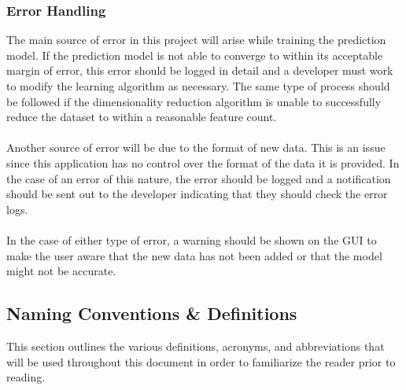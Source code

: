 \documentclass[titlepage]{article}
\begin{document}
\subsubsection{Error Handling}
The main source of error in this project will arise while training the prediction model. If the prediction model is not able to converge to within its acceptable margin of error, this error should be logged in detail and a developer must work to modify the learning algorithm as necessary. The same type of process should be followed if the dimensionality reduction algorithm is unable to successfully reduce the dataset to within a reasonable feature count.\\~\\
Another source of error will be due to the format of new data. This is an issue since this application has no control over the format of the data it is provided. In the case of an error of this nature, the error should be logged and a notification should be sent out to the developer indicating that they should check the error logs.\\~\\
In the case of either type of error, a warning should be shown on the GUI to make the user aware that the new data has not been added or that the model might not be accurate.

\subsection{Naming Conventions \& Definitions}
This section outlines the various definitions, acronyms, and abbreviations that will be used throughout this document in order to familiarize the reader prior to reading.
\end{document}
